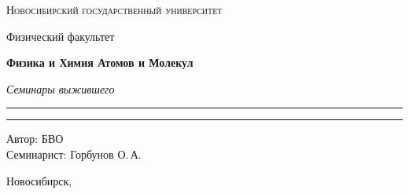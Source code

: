 \documentclass[12pt,a4paper]{report}
\begin{document}
\begin{titlepage}
    \thispagestyle{empty}

    \begin{center}
        \vspace*{1.5cm}

        {\Large\scshape Новосибирский государственный университет\par}
        \vspace{0.25cm}
        {\large Физический факультет\par}

        \vfill

        {\Huge\bfseries Физика и Химия Атомов и Молекул\par}

        \vspace{0.45cm}

        {\Large\itshape Семинары выжившего\par}

        \vspace{0.8cm}

        \rule{0.72\linewidth}{0 pt}



        \rule{2\linewidth}{0pt}

        \vfill

        \begin{flushright}
            \large
            Автор: БВО\\[0.25cm]
            Семинарист: Горбунов О.\,А.
        \end{flushright}

        \vspace{1.2cm}

        {\large Новосибирск, \the\year}

    \end{center}
\end{titlepage}

\tableofcontents
\newpage



\clearpage
\end{document}
